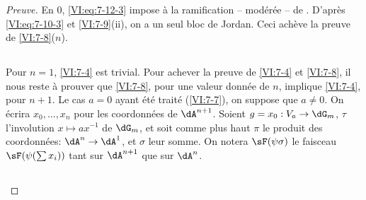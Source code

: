 \begin{proof}[Preuve]
En $0$, \eqref{VI:eq:7-12-3} impose à la ramification -- modérée -- de 
. D'après 
\eqref{VI:eq:7-10-3} et \ref{VI:7-9}(ii), on a un seul bloc de Jordan. Ceci 
achève la preuve de \ref{VI:7-8}($n$). 






\subsection{}\label{VI:7-13}

Pour $n=1$, \ref{VI:7-4} est trivial. Pour achever la preuve de \ref{VI:7-4} et 
\ref{VI:7-8}, il nous reste à prouver que \ref{VI:7-8}, pour une valeur 
donnée de $n$, implique \ref{VI:7-4}, pour $n+1$. Le cas $a=0$ ayant été 
traité (\ref{VI:7-7}), on suppose que $a\ne 0$. On écrira $x_0,\dots,x_n$ pour 
les coordonnées de $\dA^{n+1}$. Soient $g=x_0:V_a\to \dG_m$, $\tau$ 
l'involution $x\mapsto a x^{-1}$ de $\dG_m$, et soit comme plus haut $\pi$ le 
produit des coordonnées: $\dA^n \to \dA^1$, et $\sigma$ leur somme. On 
notera $\sF(\psi\sigma)$ le faisceau $\sF(\psi(\sum x_i))$ tant sur $\dA^{n+1}$ 
que sur $\dA^n$. 





\subsection{}\label{VI:7-14}


\end{proof}
